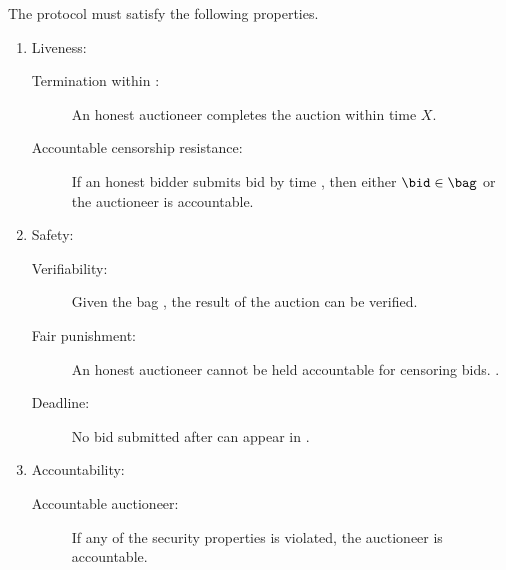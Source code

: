 \begin{definition}\label{def:auction-framework}
    The protocol must satisfy the following properties.
    \begin{enumerate}[leftmargin=*, align=left]
        \item Liveness:
        \begin{description}
            \item[Termination within \parAuctionTerm:]
                An honest auctioneer completes the auction within time $X$. 
            \item [Accountable censorship resistance:]
                If an honest bidder submits bid \bid by time \ttwo, then either $\bid \in \bag$ or the auctioneer is accountable. 
        \end{description}
        
        \item Safety:
        \begin{description}
            \item[Verifiability:]
            Given the bag \bag, the result of the auction can be verified.
            \item[Fair punishment:]
            An honest auctioneer cannot be held accountable for censoring bids. 
            .
            \item[Deadline:]
            No bid submitted after \ttwo can appear in \bag.
        \end{description}

        \item Accountability:
        \begin{description}
            \item [Accountable auctioneer:]
            If any of the security properties is violated, the auctioneer is accountable.
        \end{description}
    \end{enumerate}
\end{definition}


